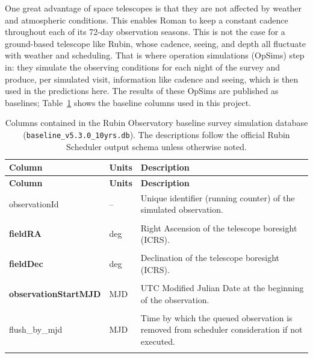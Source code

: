 \documentclass[english,10pt,a4paper]{article}
\begin{document}
	One great advantage of space telescopes is that they are not affected by weather and atmospheric conditions. This enables Roman to keep a constant cadence throughout each of its 72-day observation seasons. This is not the case for a ground-based telescope like Rubin, whose cadence, seeing, and depth all fluctuate with weather and scheduling. That is where operation simulations (OpSims) step in: they simulate the observing conditions for each night of the survey and produce, per simulated visit, information like cadence and seeing, which is then used in the predictions here. The results of these OpSims are published as baselines; Table~\ref{tab:opsim_columns} shows the baseline columns used in this project.
	
	
	\begin{longtable}{p{3.8cm}p{2cm}p{8.2cm}}
		\caption{Columns contained in the Rubin Observatory baseline survey simulation
			database (\texttt{baseline\_v5.3.0\_10yrs.db}). The descriptions follow the
			official Rubin Scheduler output schema unless otherwise noted.\cite{Ivezic2019LSST,Biswas2019OpSim,RubinSchedulerSchema,RubinSim}}
		\label{tab:opsim_columns}\\
		
		\toprule
		\textbf{Column} & \textbf{Units} & \textbf{Description} \\
		\midrule
		\endfirsthead
		
		\toprule
		\textbf{Column} & \textbf{Units} & \textbf{Description} \\
		\midrule
		\endhead
		
		observationId & -- &
		Unique identifier (running counter) of the simulated observation. \\&&\\
		
		\textbf{fieldRA} & deg &
		Right Ascension of the telescope boresight (ICRS). \\&&\\
		
		\textbf{fieldDec} & deg &
		Declination of the telescope boresight (ICRS). \\&&\\
		
		\textbf{observationStartMJD} & MJD &
		UTC Modified Julian Date at the beginning of the observation. \\&&\\
		
		flush\_by\_mjd & MJD &
		Time by which the queued observation is removed from scheduler consideration if not executed. \\&&\\
		

\end{longtable}
\end{document}
